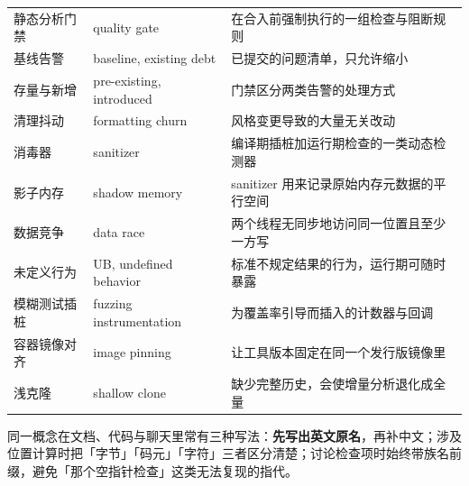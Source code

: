 \documentclass[12pt,a4paper,fontset=fandol]{ctexbook}
\begin{document}
{\begin{longtable}{@{}>{\raggedright\arraybackslash}p{}
                  >{\raggedright\arraybackslash}p{}
                  >{\raggedright\arraybackslash}p{}@{}}
静态分析门禁 & quality gate & 在合入前强制执行的一组检查与阻断规则 \\
基线告警 & baseline, existing debt & 已提交的问题清单，只允许缩小 \\
存量与新增 & pre-existing, introduced & 门禁区分两类告警的处理方式 \\
清理抖动 & formatting churn & 风格变更导致的大量无关改动 \\
消毒器 & sanitizer & 编译期插桩加运行期检查的一类动态检测器 \\
影子内存 & shadow memory & sanitizer 用来记录原始内存元数据的平行空间 \\
数据竞争 & data race & 两个线程无同步地访问同一位置且至少一方写 \\
未定义行为 & UB, undefined behavior & 标准不规定结果的行为，运行期可随时暴露 \\
模糊测试插桩 & fuzzing instrumentation & 为覆盖率引导而插入的计数器与回调 \\
容器镜像对齐 & image pinning & 让工具版本固定在同一个发行版镜像里 \\
浅克隆 & shallow clone & 缺少完整历史，会使增量分析退化成全量 \\
\end{longtable}
}

\begin{guideline}[title={查术语的三个习惯}]
同一概念在文档、代码与聊天里常有三种写法：\textbf{先写出英文原名}，再补中文；涉及位置计算时把「字节」「码元」「字符」三者区分清楚；讨论检查项时始终带族名前缀，避免「那个空指针检查」这类无法复现的指代。
\end{guideline}
\end{document}
